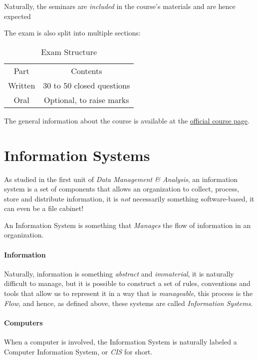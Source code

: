 \documentclass[openright, twoside, twocolumn]{report}
\begin{document}
    Naturally, the seminars are \emph{included} in the course's materials and are hence expected

    The exam is also split into multiple sections:

    \begin{table}[h!]
      \centering
      \begin{tabular}{c c}
          \rowcolor{gray!50}
          Part & Contents  \\
          Written & 30 to 50 closed questions  \\
          Oral & Optional, to raise marks \\
      \end{tabular}
      \caption{Exam Structure}
      \label{tab:label}
    \end{table}

    The general information about the course is available at the \href{http://wwwusers.di.uniroma1.it/~cilli/}{official course page}.


    \section{Information Systems} 
    
    As studied in the first unit of \emph{Data Management \& Analysis}, an information system is a set of components that allows an organization 
    to collect, process, store and distribute information, it is \emph{not} necessarily something software-based, it can even be 
    a file cabinet!

    \begin{definition}\label{def:is}
      An Information System is something that \emph{Manages} the flow of information in an organization.
    \end{definition}

    \paragraph{Information} 
    Naturally, information is something \emph{abstract} and \emph{immaterial}, it is naturally difficult to manage, but it is possible 
    to construct a set of rules, conventions and tools that allow us to represent it in a way that is \emph{manageable}, this process 
    is the \emph{Flow}, and hence, as defined above, these systems are called \emph{Information Systems}.

    \paragraph{Computers}
    When a computer is involved, the Information System is naturally labeled a Computer Information System, or \emph{CIS} for short. 
    
\end{document}
